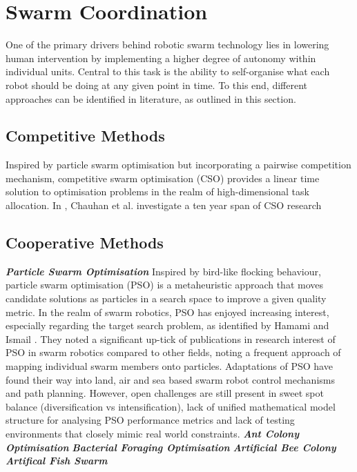 \documentclass{article}
\begin{document}
\section{Swarm Coordination}
One of the primary drivers behind robotic swarm technology lies in lowering human intervention by implementing a higher degree of autonomy within individual units. Central to this task is the ability to self-organise what each robot should be doing at any given point in time. To this end, different approaches can be identified in literature, as outlined in this section. %
\subsection{Competitive Methods}
Inspired by particle swarm optimisation but incorporating a pairwise competition mechanism, competitive swarm optimisation (CSO) \cite{CSODef} provides a linear time solution to optimisation problems in the realm of high-dimensional task allocation. 
In \cite{decadeCSO}, Chauhan et al. investigate a ten year span of CSO research  %

\subsection{Cooperative Methods}
\textbf{\textit{Particle Swarm Optimisation}} \newline
Inspired by bird-like flocking behaviour, particle swarm optimisation (PSO) \cite{PSODef} is a metaheuristic approach that moves candidate solutions as particles in a search space to improve a given quality metric. In the realm of swarm robotics, PSO has enjoyed increasing interest, especially regarding the target search problem, as identified by Hamami and Ismail \cite{PSORoboticsHamami}. They noted a significant up-tick of publications in research interest of PSO in swarm robotics compared to other fields, noting a frequent approach of mapping individual swarm members onto particles. Adaptations of PSO have found their way into land, air and sea based swarm robot control mechanisms and path planning. However, open challenges are still present in sweet spot balance (diversification vs intensification), lack of unified mathematical model structure for analysing PSO performance metrics and lack of testing environments that closely mimic real world constraints.
\newline
\textbf{\textit{Ant Colony Optimisation}}\newline
\textbf{\textit{Bacterial Foraging Optimisation}}\newline
\textbf{\textit{Artificial Bee Colony}}\newline
\textbf{\textit{Artifical Fish Swarm}}\newline
\end{document}
